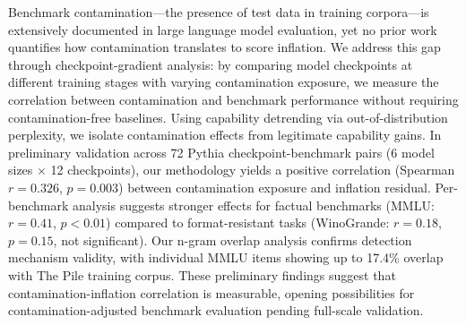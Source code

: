 Benchmark contamination---the presence of test data in training corpora---is extensively documented in large language model evaluation, yet no prior work quantifies how contamination translates to score inflation. We address this gap through checkpoint-gradient analysis: by comparing model checkpoints at different training stages with varying contamination exposure, we measure the correlation between contamination and benchmark performance without requiring contamination-free baselines. Using capability detrending via out-of-distribution perplexity, we isolate contamination effects from legitimate capability gains. In preliminary validation across 72 Pythia checkpoint-benchmark pairs (6 model sizes $\times$ 12 checkpoints), our methodology yields a positive correlation (Spearman $r = 0.326$, $p = 0.003$) between contamination exposure and inflation residual. Per-benchmark analysis suggests stronger effects for factual benchmarks (MMLU: $r = 0.41$, $p < 0.01$) compared to format-resistant tasks (WinoGrande: $r = 0.18$, $p = 0.15$, not significant). Our n-gram overlap analysis confirms detection mechanism validity, with individual MMLU items showing up to 17.4\% overlap with The Pile training corpus. These preliminary findings suggest that contamination-inflation correlation is measurable, opening possibilities for contamination-adjusted benchmark evaluation pending full-scale validation.
